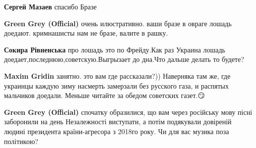 \begin{itemize}
\begin{itemize}
 
\textbf{Сергей Мазаев} спасибо Бразе 🖤

\begin{itemize}
 
\textbf{Green Grey (Official)} очень илюстративно. ваши бразе в овраге лошадь доедают. кримнашисты нам не бразе, валите в рашку.

 
\textbf{Сокира Рівненська} про лошадь это по Фрейду.Как раз Украина лошадь доедает,последнюю,советскую.Выгрызает до дна.Что дальше делать то будете?

 
\textbf{Maxim Gridin} занятно. это вам где рассказали?)) Наверняка там же, где украинцы каждую зиму насмерть замерзали без русского газа, и распятых мальчиков доедали. Меньше читайте за обедом советских газет.😏

 
\textbf{Green Grey (Official)} спочатку образилися, що вам через російську мову пісні заборонили на день Незалежності виступати, а потім подякували довіреній людині президента країни-агресора з 2018го року. Чи для вас музика поза політикою?

 

\end{itemize}
\end{itemize}
\end{itemize}
